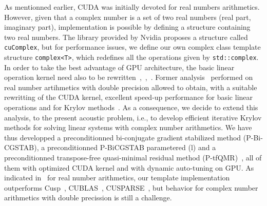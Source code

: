 \documentclass[10pt]{article}
\theoremstyle{plain}
\theoremstyle{definition}
\theoremstyle{remark}
\begin{document}
As mentionned earlier, CUDA was initially devoted for real numbers arithmetics.
However, given that a complex number is a set of two real numbers (real part, imaginary part), implementation is possible by defining a structure containing two real numbers.
The library provided by Nvidia proposes a structure called \verb+cuComplex+, but for performance issues, we define our own complex class template structure \verb+complex<T>+, which redefines all the operations given by \verb+std::complex+.
In order to take the best advantage of GPU architecture, the basic linear operation kernel need also to be rewritten~\cite{journals:KnibbeOV11},~\cite{GPU:BG:2009},~\cite{GPU:BG:2008}.
Former analysis~\cite{magoules:proceedings-auth:44} performed on real number artihmetics with double precision allowed to obtain, with a suitable rewritting of the CUDA kernel, excellent speed-up performance for basic linear operations and for Krylov methods~\cite{magoules:proceedings-auth:45,magoules:proceedings-auth:48}.
As a consequence, we decide to extend this analysis, to the present acoustic problem, i.e., to develop efficient iterative Krylov methods for solving linear systems with complex number arithmetics.
We have thus developped a preconditionned bi-conjugate gradient stabilized method (P-Bi-CGSTAB), a preconditionned P-BiCGSTAB parametered (l) and a preconditionned transpose-free quasi-minimal residual method (P-tfQMR)~\cite{saad_iterative_2003}, all of them with optimized CUDA kernel and with dynamic auto-tuning on GPU.
As indicated in~\cite{magoules:proceedings-auth:48} for real number arithmetics, our template implementation outperforms Cusp~\cite{GPU:CUSP:2010}, CUBLAS~\cite{GPU:CUBLAS}, CUSPARSE~\cite{GPU:CUSPARSE4.0:2011}, but behavior for complex number arithmetics with double precission is still a challenge.
\end{document}
